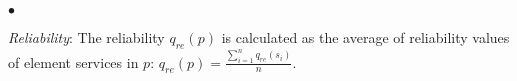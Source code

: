 \documentclass{new_tlp}
\begin{document}
\begin{list}{$\bullet$}{\itemsep=0pt \parsep=0pt \topsep=0pt \leftmargin=10pt}
%    
%    
    \item {\em Reliability}: The reliability $q_{re}(p)$ is calculated as the average of reliability values of element services in $p$: $q_{re}(p) = \frac{\sum_{i=1}^{n} q_{re}(s_i)}{n}$. 
\end{list}

\end{document}
